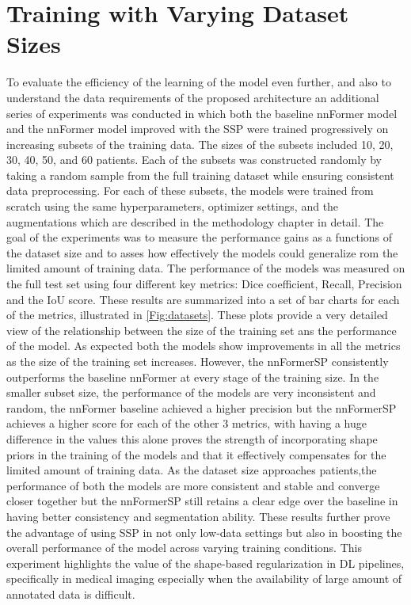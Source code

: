 \section{Training with Varying Dataset Sizes}
To evaluate the efficiency of the learning of the model even further, and also to understand the data requirements of the proposed architecture an additional series of experiments was conducted in which both the baseline nnFormer model and the nnFormer model improved with the SSP were trained progressively on increasing subsets of the training data. The sizes of the subsets included 10, 20, 30, 40, 50, and 60 patients. Each of the subsets was constructed randomly by taking a random sample from the full training dataset while ensuring consistent data preprocessing. For each of these subsets, the models were trained from scratch using the same hyperparameters, optimizer settings, and the augmentations which are described in the methodology chapter in detail. The goal of the experiments was to measure the performance gains as a functions of the dataset size and to asses how effectively the models could generalize rom the limited amount of training data. The performance of the models was measured on the full test set using four different key metrics: Dice coefficient, Recall, Precision and the IoU score. These results are summarized into a set of bar charts for each of the metrics, illustrated in \cref{Fig:datasets}. These plots provide a very detailed view of the relationship between the size of the training set ans the performance of the model. As expected both the models show improvements in all the metrics as the size of the training set increases. However, the nnFormerSP consistently outperforms the baseline nnFormer at every stage of the training size. In the smaller subset size, the performance of the models are very inconsistent and random, the nnFormer baseline achieved a higher precision but the nnFormerSP achieves a higher score for each of the other 3 metrics, with having a huge difference in the values this alone proves the strength of incorporating shape priors in the training of the models and that it effectively compensates for the limited amount of training data. As the dataset size approaches patients,the performance of both the models are more consistent and stable and converge closer together but the nnFormerSP still retains a clear edge over the baseline in having better consistency and segmentation ability. These results further prove the advantage of using SSP in not only low-data settings but also in boosting the overall performance of the model across varying training conditions. This experiment highlights the value of the shape-based regularization in DL pipelines, specifically in medical imaging especially when the availability of large amount of annotated data is difficult.

